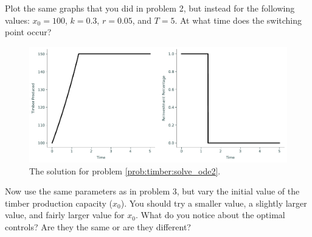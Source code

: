 \begin{problem}
\label{prob:timber:solve_ode2}
Plot the same graphs that you did in problem 2, but instead for the following values: $x_0 = 100$, $k = 0.3$, $r = 0.05$, and $T = 5$. At what time does the switching point occur?

\end{problem}
\begin{figure}[H]
\includegraphics[width=\textwidth]{figures/Example_problem3.pdf}
\caption{The solution for problem \ref{prob:timber:solve_ode2}.}
\end{figure}


\begin{problem}
Now use the same parameters as in problem 3, but vary the initial value of the timber production capacity ($x_{0}$). 
You should try a smaller value, a slightly larger value, and fairly larger value for $x_{0}$.
What do you notice about the optimal controls? 
Are they the same or are they different?

\end{problem}


